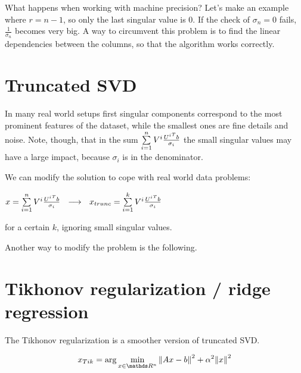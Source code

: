 \documentclass[computationalMathematics.tex]{subfiles}
\begin{document}
  What happens when working with machine precision? Let's make an example where $r = n-1$, so only the last singular value is $0$. If the check of $\sigma_n = 0$ fails, $\frac{1}{\sigma_n}$ becomes very big. A way to circumvent this problem is to find the linear dependencies between the columns, so that the algorithm works correctly.


\section{Truncated SVD}
In many real world setups first singular components correspond to the most prominent features of the dataset, while the smallest ones are fine details and noise. Note, though, that in the sum $\sum\limits_{i=1}^n V^i \frac{{U^i}^{T} b}{\sigma_i}$ the small singular values may have a large impact, because $\sigma_i$ is in the denominator.

We can modify the solution to cope with real world data problems:

$x = \sum\limits_{i=1}^n V^i \frac{{U^i}^{T} b}{\sigma_i} ~~\longrightarrow ~~x_{trunc} = \sum\limits_{i=1}^{k} V^i \frac{{U^i}^{T} b}{\sigma_i}$

for a certain $k$, ignoring small singular values.

Another way to modify the problem is the following.

\section{Tikhonov regularization / ridge regression}

The Tikhonov regularization is a smoother version of truncated SVD.%

\[
  x_{Tik} = \arg \min_{x \in \R^n} \sqrnorm{Ax-b} + \alpha^2 \sqrnorm{x}
\]
\end{document}
